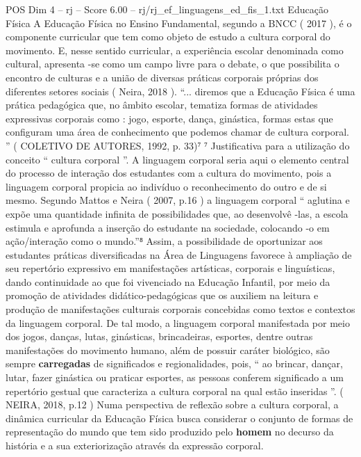 \begin{textsample}{POS Dim 4 – rj – Score 6.00 – rj/rj\_ef\_linguagens\_ed\_fis\_1.txt}  \label{ex:f4_pos_168}
Educação Física A Educação Física no Ensino Fundamental, segundo a BNCC ( 2017 ), é o componente curricular que tem como objeto de estudo a cultura corporal do movimento.
E, nesse sentido curricular, a experiência escolar denominada como cultural, apresenta -se como um campo livre para o debate, o que possibilita o encontro de culturas e a união de diversas práticas corporais próprias dos diferentes setores sociais ( Neira, 2018 ). “... diremos que a Educação Física é uma prática pedagógica que, no âmbito escolar, tematiza formas de atividades expressivas corporais como : jogo, esporte, dança, ginástica, formas estas que configuram uma área de conhecimento que podemos chamar de cultura corporal. ” ( COLETIVO DE AUTORES, 1992, p. 33)⁷ ⁷ Justificativa para a utilização do conceito “ cultura corporal ”.
A linguagem corporal seria aqui o elemento central do processo de interação dos estudantes com a cultura do movimento, pois a linguagem corporal propicia ao indivíduo o reconhecimento do outro e de si mesmo.
Segundo Mattos e Neira ( 2007, p.16 ) a linguagem corporal “ aglutina e expõe uma quantidade infinita de possibilidades que, ao desenvolvê -las, a escola estimula e aprofunda a inserção do estudante na sociedade, colocando -o em ação/interação como o mundo.”⁸ Assim, a possibilidade de oportunizar aos estudantes práticas diversificadas na Área de Linguagens favorece à ampliação de seu repertório expressivo em manifestações artísticas, corporais e linguísticas, dando continuidade ao que foi vivenciado na Educação Infantil, por meio da promoção de atividades didático-pedagógicas que os auxiliem na leitura e produção de manifestações culturais corporais concebidas como textos e contextos da linguagem corporal.
De tal modo, a linguagem corporal manifestada por meio dos jogos, danças, lutas, ginásticas, brincadeiras, esportes, dentre outras manifestações do movimento humano, além de possuir caráter biológico, são sempre \textbf{carregadas} de significados e regionalidades, pois, “ ao brincar, dançar, lutar, fazer ginástica ou praticar esportes, as pessoas conferem significado a um repertório gestual que caracteriza a cultura corporal na qual estão inseridas ”. ( NEIRA, 2018, p.12 ) Numa perspectiva de reflexão sobre a cultura corporal, a dinâmica curricular da Educação Física busca considerar o conjunto de formas de representação do mundo que tem sido produzido pelo \textbf{homem} no decurso da história e a sua exteriorização através da expressão corporal.

\end{textsample}

